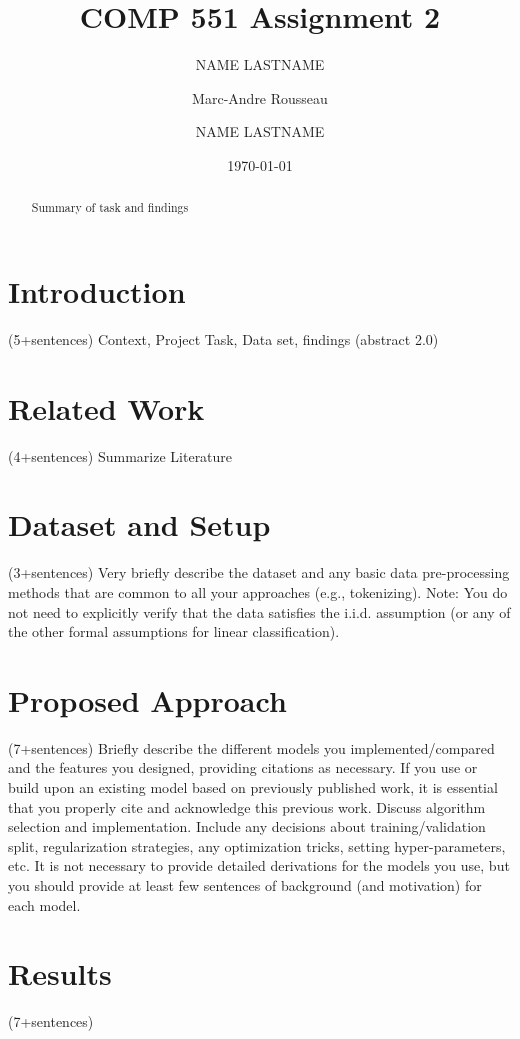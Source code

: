 \documentclass{amsart}
\theoremstyle{definition}
\theoremstyle{remark}
\numberwithin{equation}{section}
\begin{document}
\vspace*{-80pt}

\title{COMP 551 Assignment 2}

\author{NAME LASTNAME}
\author{Marc-Andre Rousseau}
\author{NAME LASTNAME}
\subjclass[2010]{}
\date{\today}
\begin{abstract}
Summary of task and findings
\end{abstract}
\maketitle
\section{Introduction}(5+sentences)
Context, Project Task, Data set, findings (abstract 2.0)
\section{Related Work}(4+sentences)
Summarize Literature
\section{Dataset and Setup}(3+sentences)
Very briefly describe the dataset and any basic data pre-processing
methods that are common to all your approaches (e.g., tokenizing). Note: You do not need to explicitly verify that the data satisfies the i.i.d. assumption (or any of the other formal assumptions for linear
classification).
\section{Proposed Approach}(7+sentences)
Briefly describe the different models you implemented/compared
and the features you designed, providing citations as necessary. If you use or build upon an existing
model based on previously published work, it is essential that you properly cite and acknowledge this previous work. Discuss algorithm selection and implementation. Include any decisions about
training/validation split, regularization strategies, any optimization tricks, setting hyper-parameters, etc. It
is not necessary to provide detailed derivations for the models you use, but you should provide at least few
sentences of background (and motivation) for each model.
\section{Results} (7+sentences)
\end{document}
